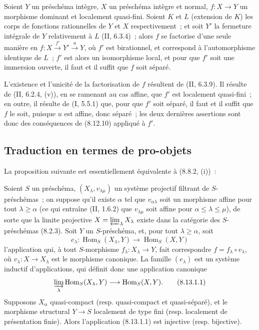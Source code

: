 \begin{corollary}[8.12.11]
\label{IV.8.12.11-fr}
Soient $Y$ un préschéma intègre, $X$ un préschéma intègre et normal,
$f:X\to Y$ un morphisme dominant et localement quasi-fini. Soient $K$ et
$L$ (extension de $K$) les corps de fonctions rationnelles de $Y$ et $X$
respectivement~; et soit $Y'$ la fermeture intégrale de $Y$ relativement à
$L$ (II, 6.3.4)~; alors $f$ se factorise d'une seule manière en
$f:X\xrightarrow{f'}Y'\xrightarrow{u}Y$, où $f'$ est birationnel, et
correspond à l'automorphisme identique de $L$~; $f'$ est alors un
isomorphisme local, et pour que $f'$ soit une immersion ouverte, il faut et
il suffit que $f$ soit séparé.
\end{corollary}

L'existence et l'unicité de la factorisation de $f$ résultent de (II, 6.3.9).
Il résulte de (II, 6.2.4, (v)), en se ramenant au cas affine, que $f'$ est
localement quasi-fini~; en outre, il résulte de (I, 5.5.1) que, pour que
$f'$ soit séparé, il faut et il suffit que $f$ le soit, puisque $u$ est
affine, donc séparé~; les deux dernières assertions sont donc des
conséquences de (8.12.10) appliqué à $f'$.

\subsection{Traduction en termes de pro-objets}
\label{subsection:IV.8.13-fr}

La proposition suivante est essentiellement équivalente à (8.8.2, (i))~:

\begin{proposition}[8.13.1]
\label{IV.8.13.1-fr}
Soient $S$ un préschéma, $(X_\lambda,v_{\lambda\mu})$ un système projectif
filtrant de $S$-préschémas~; on suppose qu'il existe $\alpha$ tel que
$v_{\alpha\lambda}$ soit un morphisme affine pour tout $\lambda\geqslant
\alpha$ (ce qui entraîne (II, 1.6.2) que $v_{\lambda\mu}$ soit affine pour
$\alpha\leqslant\lambda\leqslant\mu$), de sorte que la limite projective
$X=\varprojlim_\lambda X_\lambda$ existe dans la catégorie des $S$-préschémas
(8.2.3). Soit $Y$ un $S$-préschéma, et, pour tout $\lambda\geqslant\alpha$,
soit
\[
e_\lambda:\operatorname{Hom}_S(X_\lambda,Y)
\longrightarrow\operatorname{Hom}_S(X,Y)
\]
l'application qui, à tout $S$-morphisme $f_\lambda:X_\lambda\to Y$, fait
correspondre $f=f_\lambda\circ v_\lambda$, où $v_\lambda:X\to X_\lambda$
est le morphisme canonique. La famille $(e_\lambda)$ est un système inductif
d'applications, qui définit donc une application canonique
\begin{equation}
\label{IV.8.13.1.1-fr}
\varinjlim_\lambda\operatorname{Hom}_S(X_\lambda,Y)
\longrightarrow\operatorname{Hom}_S(X,Y). \tag{8.13.1.1}
\end{equation}
Supposons $X_\alpha$ quasi-compact (resp. quasi-compact et quasi-séparé), et le
morphisme structural $Y\to S$ localement de type fini (resp. localement de
présentation finie). Alors l'application (8.13.1.1) est injective (resp.
bijective).
\end{proposition}

